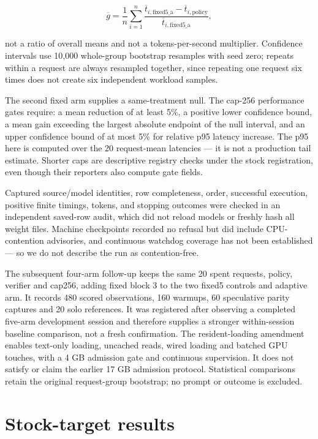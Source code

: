 \documentclass[
  11pt,
]{article}
\begin{document}
\[
\overline g=\frac{1}{n}\sum_{i=1}^{n}
\frac{\overline t_{i,\mathrm{fixed5\_a}}-\overline t_{i,\mathrm{policy}}}
{\overline t_{i,\mathrm{fixed5\_a}}},
\]

not a ratio of overall means and not a tokens-per-second multiplier.
Confidence intervals use 10,000 whole-group bootstrap resamples with
seed zero; repeats within a request are always resampled together, since
repeating one request six times does not create six independent workload
samples.

The second fixed arm supplies a same-treatment null. The cap-256
performance gates require: a mean reduction of at least 5\%, a positive
lower confidence bound, a mean gain exceeding the largest absolute
endpoint of the null interval, and an upper confidence bound of at most
5\% for relative p95 latency increase. The p95 here is computed over the
20 request-mean latencies --- it is not a production tail estimate.
Shorter caps are descriptive registry checks under the stock
registration, even though their reporters also compute gate fields.

Captured source/model identities, row completeness, order, successful
execution, positive finite timings, tokens, and stopping outcomes were
checked in an independent saved-row audit, which did not reload models
or freshly hash all weight files. Machine checkpoints recorded no
refusal but did include CPU-contention advisories, and continuous
watchdog coverage has not been established --- so we do not describe the
run as contention-free.

The subsequent four-arm follow-up keeps the same 20 spent requests,
policy, verifier and cap256, adding fixed block 3 to the two fixed5
controls and adaptive arm. It records 480 scored observations, 160
warmups, 60 speculative parity captures and 20 solo references. It was
registered after observing a completed five-arm development session and
therefore supplies a stronger within-session baseline comparison, not a
fresh confirmation. The resident-loading amendment enables text-only
loading, uncached reads, wired loading and batched GPU touches, with a 4
GB admission gate and continuous supervision. It does not satisfy or
claim the earlier 17 GB admission protocol. Statistical comparisons
retain the original request-group bootstrap; no prompt or outcome is
excluded.

\section{Stock-target results}\label{stock-target-results}
\end{document}
